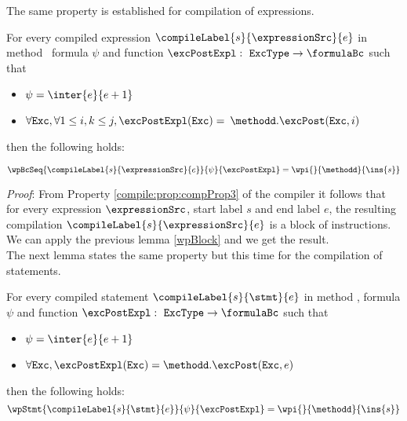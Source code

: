 The same property is established for compilation of expressions. 
\begin{relWpExpr}\label{relWpExpr}
     For every compiled expression $\compileLabel{s}{\expressionSrc}{e}$  in  method \methodd  \,  formula $\psi$ and function $\excPostExpl : \mbox{ \rm \texttt{ExcType}}  \rightarrow \formulaBc $ such that 

      \begin{itemize}
            \item $\psi = \inter{e}{e+1}$ 
	    \item $\forall \mbox{\rm\texttt{Exc}} ,  \forall 1 \le i,k \le j,  \excPostExpl( \mbox{\rm\texttt{Exc}} ) =$ 
                  $ \methodd.\excPost(\mbox{\rm\texttt{Exc}}, i ) $ 
            

      \end{itemize} then the following holds:

     $$   \wpBcSeq{\compileLabel{s}{\expressionSrc}{e}   }{\psi }{\excPostExpl} = \wpi{}{\methodd}{\ins{s}}$$        

\end{relWpExpr}

\textit{Proof}: From Property \ref{compile:prop:compProp3} of the compiler it follows that for every expression
 $\expressionSrc$, start label $s$  and  end label $e$,
  the resulting compilation   $\compileLabel{s}{\expressionSrc}{e}$ is a block of instructions. We can apply 
 the previous lemma  \ref{wpBlock} and we get the result.
\Qed \\

The next lemma states the same property but this time for the compilation of statements.
\begin{relWpStmt}\label{relWpStmt}
     For every compiled statement $\compileLabel{s}{\stmt}{e}$  in  method \methodd, formula $\psi$ and 
    function $\excPostExpl : \mbox{ \rm \texttt{ExcType}}  \rightarrow \formulaBc $ such that 

      \begin{itemize}
            \item $\psi = \inter{e}{e+1}$
	    \item $\forall \mbox{\rm\texttt{Exc}} ,  \excPostExpl( \mbox{\rm\texttt{Exc}} ) = \methodd.\excPost(\mbox{\rm\texttt{Exc}}, e ) $ 
      \end{itemize} then the following holds: 
     $$   \wpStmt{\compileLabel{s}{\stmt}{e} }{\psi }{\excPostExpl} = \wpi{}{\methodd}{\ins{s}}$$   
\end{relWpStmt}

